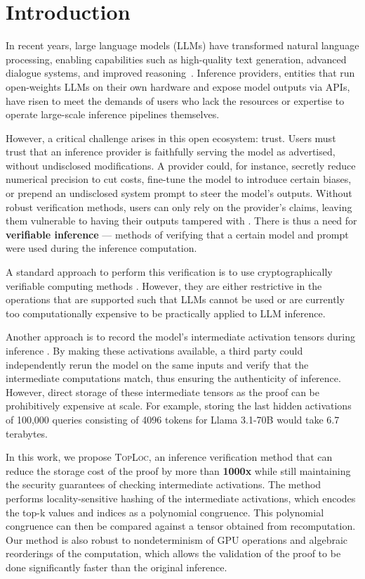 \documentclass{article}
\theoremstyle{plain}
\theoremstyle{definition}
\theoremstyle{remark}
\newcommand{\toploc}{\textsc{TopLoc}}
\begin{document}
\section{Introduction}

In recent years, large language models (LLMs) have transformed natural language processing, enabling capabilities such as high-quality text generation, advanced dialogue systems, and improved reasoning~\citep{llama3, gemma2}.
Inference providers, entities that run open-weights LLMs on their own hardware and expose model outputs via APIs, have risen to meet the demands of users who lack the resources or expertise to operate large-scale inference pipelines themselves.

However, a critical challenge arises in this open ecosystem: trust.
Users must trust that an inference provider is faithfully serving the model as advertised, without undisclosed modifications.
A provider could, for instance, secretly reduce numerical precision to cut costs, fine-tune the model to introduce certain biases, or prepend an undisclosed system prompt to steer the model's outputs.
Without robust verification methods, users can only rely on the provider’s claims, leaving them vulnerable to having their outputs tampered with \citep{chen2023chatgptsbehaviorchangingtime}.
There is thus a need for \textbf{verifiable inference} --- methods of verifying that a certain model and prompt were used during the inference computation.

A standard approach to perform this verification is to use cryptographically verifiable computing methods \citep{zkllm, firstZKML, zkDNN, zkDL, safetynets}.
However, they are either restrictive in the operations that are supported such that LLMs cannot be used or are currently too computationally expensive to be practically applied to LLM inference.

Another approach is to record the model’s intermediate activation tensors during inference \citep{svip, Verisplit}. 
By making these activations available, a third party could independently rerun the model on the same inputs and verify that the intermediate computations match, thus ensuring the authenticity of inference.
However, direct storage of these intermediate tensors as the proof can be prohibitively expensive at scale.
For example, storing the last hidden activations of 100,000 queries consisting of 4096 tokens for Llama 3.1-70B would take 6.7 terabytes.

In this work, we propose \toploc, an inference verification method that can reduce the storage cost of the proof by more than \textbf{1000x} while still maintaining the security guarantees of checking intermediate activations.
The method performs locality-sensitive hashing of the intermediate activations, which encodes the top-k values and indices as a polynomial congruence.
This polynomial congruence can then be compared against a tensor obtained from recomputation.
Our method is also robust to nondeterminism of GPU operations and algebraic reorderings of the computation, which allows the validation of the proof to be done significantly faster than the original inference.
\end{document}

